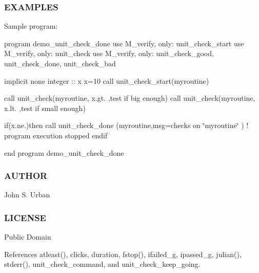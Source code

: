 \subsubsection*{E\+X\+A\+M\+P\+L\+ES}

Sample program\+:

program demo\+\_\+unit\+\_\+check\+\_\+done use M\+\_\+verify, only\+: unit\+\_\+check\+\_\+start use M\+\_\+verify, only\+: unit\+\_\+check use M\+\_\+verify, only\+: unit\+\_\+check\+\_\+good, unit\+\_\+check\+\_\+done, unit\+\_\+check\+\_\+bad

implicit none integer \+:\+: x x=10 call unit\+\_\+check\+\_\+start(\textquotesingle{}myroutine\textquotesingle{})

call unit\+\_\+check(\textquotesingle{}myroutine\textquotesingle{}, x.\+gt. ,\textquotesingle{}test if big enough\textquotesingle{}) call unit\+\_\+check(\textquotesingle{}myroutine\textquotesingle{}, x.\+lt. ,\textquotesingle{}test if small enough\textquotesingle{})

if(x.\+ne.)then call unit\+\_\+check\+\_\+done (\textquotesingle{}myroutine\textquotesingle{},msg=\textquotesingle{}checks on \char`\"{}myroutine\char`\"{}\textquotesingle{} ) ! program execution stopped endif

end program demo\+\_\+unit\+\_\+check\+\_\+done \subsubsection*{A\+U\+T\+H\+OR}

John S. Urban \subsubsection*{L\+I\+C\+E\+N\+SE}

Public Domain 

References atleast(), clicks, duration, fstop(), ifailed\+\_\+g, ipassed\+\_\+g, julian(), stderr(), unit\+\_\+check\+\_\+command, and unit\+\_\+check\+\_\+keep\+\_\+going.

